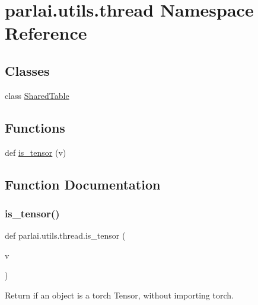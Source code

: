 \hypertarget{namespaceparlai_1_1utils_1_1thread}{}\section{parlai.\+utils.\+thread Namespace Reference}
\label{namespaceparlai_1_1utils_1_1thread}
\subsection*{Classes}
\begin{DoxyCompactItemize}
\item 
class \hyperlink{classparlai_1_1utils_1_1thread_1_1SharedTable}{Shared\+Table}
\end{DoxyCompactItemize}
\subsection*{Functions}
\begin{DoxyCompactItemize}
\item 
def \hyperlink{namespaceparlai_1_1utils_1_1thread_ad2b01da95ecdc33d8dce76a79f48137f}{is\+\_\+tensor} (v)
\end{DoxyCompactItemize}


\subsection{Function Documentation}
\mbox{\label{namespaceparlai_1_1utils_1_1thread_ad2b01da95ecdc33d8dce76a79f48137f}} 
\subsubsection{\texorpdfstring{is\+\_\+tensor()}{is\_tensor()}}
{\footnotesize\ttfamily def parlai.\+utils.\+thread.\+is\+\_\+tensor (\begin{DoxyParamCaption}\item[{}]{v }\end{DoxyParamCaption})}

\begin{DoxyVerb}Return if an object is a torch Tensor, without importing torch.
\end{DoxyVerb}
 

